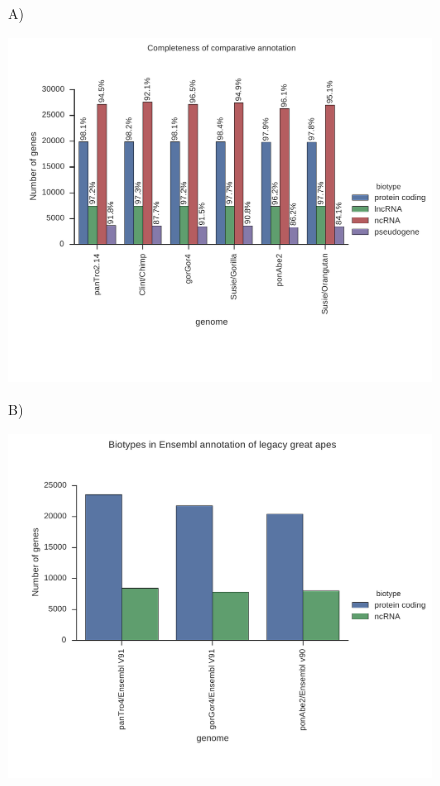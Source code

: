 \documentclass[fleqn,10pt]{wlscirep}
\begin{document}
\begin{figure}
\centering

A)

\includegraphics[scale=0.7]{primate_completeness_old_and_new.pdf}

B)

\includegraphics[scale=0.5]{ensembl_primate_biotypes.pdf}


\end{figure}
\end{document}
